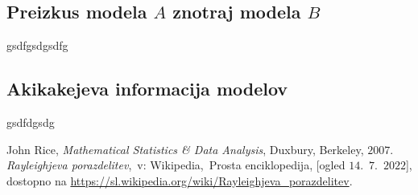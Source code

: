 \documentclass[a4paper, 10pt]{article}
\begin{document}
	\subsection{Preizkus modela $A$ znotraj modela $B$}\label{susect: 3A}
	gsdfgsdgsdfg
	\subsection{Akikakejeva informacija modelov}\label{subsect: 3B}
	gsdfdgsdg
	\begin{thebibliography}{3}
		 John Rice, \emph{Mathematical Statistics \& Data Analysis}, Duxbury, Berkeley, $2007$.
		 \emph{Rayleighjeva porazdelitev},~v: Wikipedia,~Prosta enciklopedija, [ogled $14$.~$7$.~$2022$], dostopno na \url{https://sl.wikipedia.org/wiki/Rayleighjeva_porazdelitev}.
	\end{thebibliography}
\end{document}
